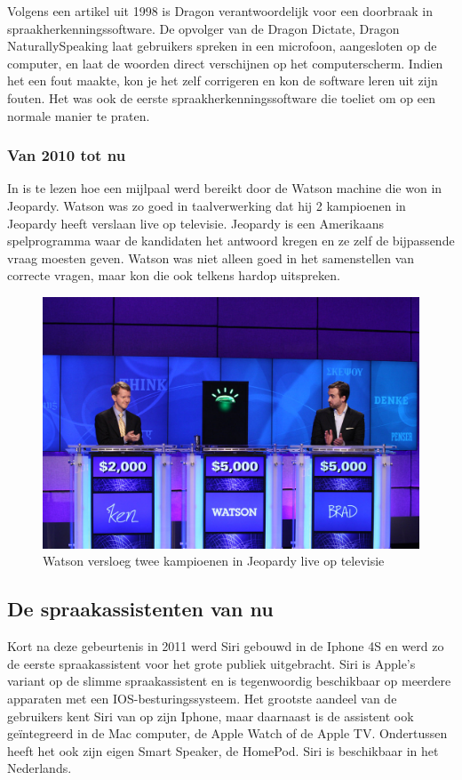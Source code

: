Volgens een artikel uit 1998 \autocite{Puri1998} is Dragon verantwoordelijk voor een doorbraak in spraakherkenningssoftware. De opvolger van de Dragon Dictate, Dragon NaturallySpeaking laat gebruikers spreken in een microfoon, aangesloten op de computer, en laat de woorden direct verschijnen op het computerscherm. Indien het een fout maakte, kon je het zelf corrigeren en kon de software leren uit zijn fouten. Het was ook de eerste spraakherkenningssoftware die toeliet om op een normale manier te praten.

\subsubsection{Van 2010 tot nu}
In \autocite{IBM2011} is te lezen hoe een mijlpaal werd bereikt door de Watson machine die won in Jeopardy. Watson was zo goed in taalverwerking dat hij 2 kampioenen in Jeopardy heeft verslaan live op televisie. Jeopardy is een Amerikaans spelprogramma waar de kandidaten het antwoord kregen en ze zelf de bijpassende vraag moesten geven. Watson was niet alleen goed in het samenstellen van correcte vragen, maar kon die ook telkens hardop uitspreken.

\begin{figure}[h]
    \includegraphics[width=0.7\linewidth]{img/WatsonJeopardy}
    \caption{Watson versloeg twee kampioenen in Jeopardy live op televisie \autocite{Markoff2011}}
    \label{fig:watson}
\end{figure}

\subsection{De spraakassistenten van nu}
\label{ss:de spraakassistenten van nu}
Kort na deze gebeurtenis in 2011 werd Siri gebouwd in de Iphone 4S en werd zo de eerste spraakassistent voor het grote publiek uitgebracht. Siri is Apple's variant op de slimme spraakassistent en is tegenwoordig beschikbaar op meerdere apparaten met een IOS-besturingssysteem. Het grootste aandeel van de gebruikers kent Siri van op zijn Iphone, maar daarnaast is de assistent ook geïntegreerd in de Mac computer, de Apple Watch of de Apple TV. Ondertussen heeft het ook zijn eigen Smart Speaker, de HomePod. Siri is beschikbaar in het Nederlands.

